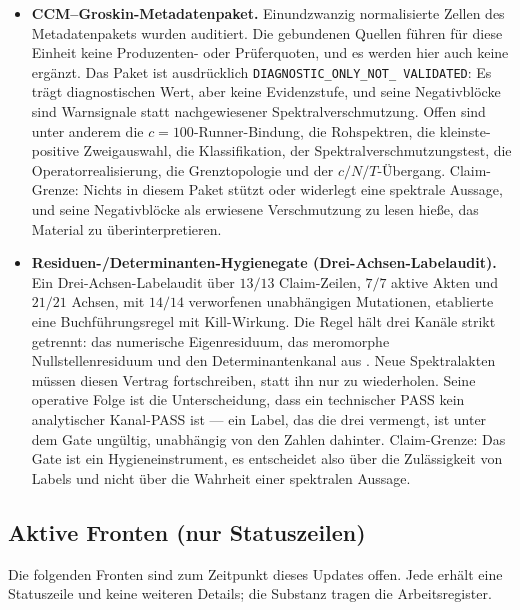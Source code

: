 \documentclass[12pt,a4paper]{article}
\theoremstyle{definition}
\theoremstyle{remark}
\begin{document}
\begin{itemize}
  \item \textbf{CCM--Groskin-Metadatenpaket.} Einundzwanzig normalisierte
    Zellen des Metadatenpakets wurden auditiert. Die gebundenen Quellen
    führen für diese Einheit keine Produzenten- oder Prüferquoten, und es
    werden hier auch keine ergänzt. Das Paket ist ausdrücklich
    \texttt{DIAGNOSTIC\_\allowbreak ONLY\_\allowbreak NOT\_\allowbreak
    VALIDATED}: Es trägt diagnostischen Wert, aber keine Evidenzstufe, und
    seine Negativblöcke sind Warnsignale statt nachgewiesener
    Spektralverschmutzung. Offen sind unter anderem die
    $c = 100$-Runner-Bindung, die Rohspektren, die kleinste-positive
    Zweigauswahl, die Klassifikation, der Spektralverschmutzungstest, die
    Operatorrealisierung, die Grenztopologie und der
    $c/N/T$-Übergang. Claim-Grenze: Nichts in diesem Paket stützt oder
    widerlegt eine spektrale Aussage, und seine Negativblöcke als erwiesene
    Verschmutzung zu lesen hieße, das Material zu überinterpretieren.

  \item \textbf{Residuen-/Determinanten-Hygienegate
    (Drei-Achsen-Labelaudit).} Ein Drei-Achsen-Labelaudit über $13/13$
    Claim-Zeilen, $7/7$ aktive Akten und $21/21$ Achsen, mit $14/14$
    verworfenen unabhängigen Mutationen, etablierte eine Buchführungsregel
    mit Kill-Wirkung. Die Regel hält drei Kanäle strikt getrennt: das
    numerische Eigenresiduum, das meromorphe Nullstellenresiduum und den
    Determinantenkanal aus . Neue Spektralakten
    müssen diesen Vertrag fortschreiben, statt ihn nur zu wiederholen.
    Seine operative Folge ist die Unterscheidung, dass ein technischer PASS
    kein analytischer Kanal-PASS ist --- ein Label, das die drei vermengt,
    ist unter dem Gate ungültig, unabhängig von den Zahlen dahinter.
    Claim-Grenze: Das Gate ist ein Hygieneinstrument, es entscheidet also
    über die Zulässigkeit von Labels und nicht über die Wahrheit einer
    spektralen Aussage.
\end{itemize}

\subsection{Aktive Fronten (nur Statuszeilen)}
\label{sec:v32-fronts}

Die folgenden Fronten sind zum Zeitpunkt dieses Updates offen. Jede erhält
eine Statuszeile und keine weiteren Details; die Substanz tragen die
Arbeitsregister.
\end{document}
